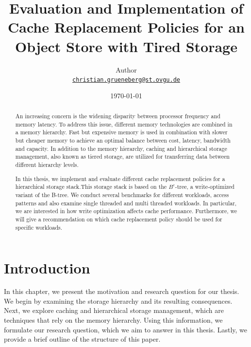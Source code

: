 \documentclass[
	12pt,
	a4paper,
	abstract,
	bibliography=totoc,
	chapterprefix,
	headings=openright,
	numbers=endperiod,
	parskip=half,
	twoside,
]{scrreprt}
\title{Evaluation and Implementation of Cache Replacement Policies for an Object Store with Tired Storage}
\author{
Author\\
{\large\href{mailto:christian.grueneberg@st.ovgu.de}{\nolinkurl{christian.grueneberg@st.ovgu.de}}}
}
\date{\today}
\begin{document}
{}

\maketitle

\begin{abstract}

An increasing concern is the widening disparity between processor frequency and memory latency.
To address this issue, different memory technologies are combined in a memory hierarchy.
Fast but expensive memory is used in combination with slower but cheaper memory to achieve 
an optimal balance between cost, latency, bandwidth and capacity.
In addition to the memory hierarchy, caching and hierarchical storage management, 
also known as tiered storage, are utilized for transferring data between different hierarchy levels.

In this thesis, we implement and evaluate different cache replacement policies for a hierarchical storage 
stack.This storage stack is based on the $B^{\varepsilon}$-tree, a write-optimized variant of the B-tree.
We conduct several benchmarks for different workloads, access patterns and also examine single threaded and
multi threaded workloads. 
In particular, we are interested in how write optimization affects cache performance.
Furthermore, we will give a recommendation on which cache replacement policy should be used for specific workloads.

\end{abstract}

\tableofcontents

\cleardoubleoddpage
{}

\chapter{Introduction}
\label{cha:introduction}


In this chapter, we present the motivation and research question for our thesis.
We begin by examining the storage hierarchy and its resulting consequences.
Next, we explore caching and hierarchical storage management, which are techniques that rely on the memory hierarchy.
Using this information, we formulate our research question, which we aim to answer in this thesis.
Lastly, we provide a brief outline of the structure of this paper.
\end{document}
